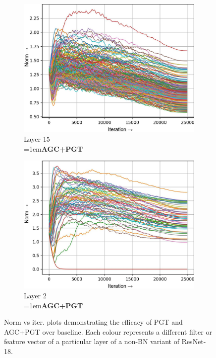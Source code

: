 \documentclass[runningheads]{llncs}
\newcommand{\forceindenta}{\parindent=1em\indent\parindent=0pt\relax}
\begin{document}
\begin{figure}[h]
\begin{subfigure}[t]{0.34\textwidth}
\includegraphics[width=\textwidth]{trimmed/agc_pgt-w-layer-5-3}
\caption{Layer 15\\ \forceindenta\textbf{AGC+PGT}}
\end{subfigure}
\begin{subfigure}[t]{0.34\textwidth}
\includegraphics[width=\textwidth]{trimmed/agc_pgt-w-layer-1-2}
\caption{Layer 2\\ \forceindenta\textbf{AGC+PGT}}
\end{subfigure}
\caption{ Norm vs iter. plots demonstrating the efficacy of PGT and AGC+PGT over
baseline. Each colour represents a different filter or feature vector of a particular
layer of a non-BN variant of ResNet-18. }
\end{figure}
\end{document}
